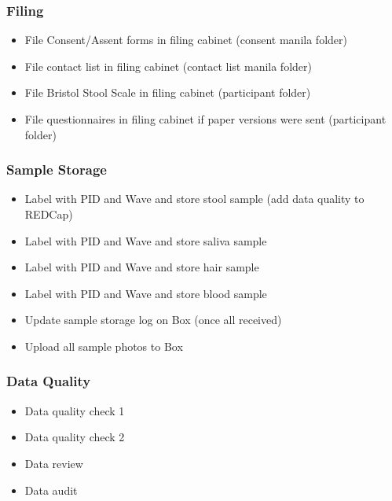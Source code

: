 \documentclass[]{book}
\providecommand{\tightlist}{%
  \setlength{\itemsep}{0pt}\setlength{\parskip}{0pt}}
\begin{document}
\hypertarget{filing-7}{%
\subsubsection{Filing}\label{filing-7}}

\begin{itemize}
\tightlist
\item
  File Consent/Assent forms in filing cabinet (consent manila folder)
\item
  File contact list in filing cabinet (contact list manila folder)
\item
  File Bristol Stool Scale in filing cabinet (participant folder)
\item
  File questionnaires in filing cabinet if paper versions were sent (participant folder)
\end{itemize}

\hypertarget{sample-storage-3}{%
\subsubsection{Sample Storage}\label{sample-storage-3}}

\begin{itemize}
\tightlist
\item
  Label with PID and Wave and store stool sample (add data quality to REDCap)
\item
  Label with PID and Wave and store saliva sample
\item
  Label with PID and Wave and store hair sample
\item
  Label with PID and Wave and store blood sample
\item
  Update sample storage log on Box (once all received)
\item
  Upload all sample photos to Box
\end{itemize}

\hypertarget{data-quality-3}{%
\subsubsection{Data Quality}\label{data-quality-3}}

\begin{itemize}
\tightlist
\item
  Data quality check 1
\item
  Data quality check 2
\item
  Data review
\item
  Data audit
\end{itemize}
\end{document}
